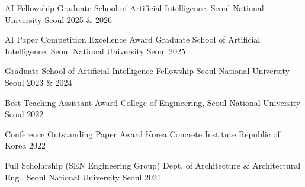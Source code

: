

\begin{cvhonors}

  \cvhonor
    {AI Fellowship} %
    {Graduate School of Artificial Intelligence, Seoul National University} %
    {Seoul} %
    {2025 \& 2026} %

  \cvhonor
    {AI Paper Competition Excellence Award} %
    {Graduate School of Artificial Intelligence, Seoul National University} %
    {Seoul} %
    {2025} %

  \cvhonor
    {Graduate School of Artificial Intelligence Fellowship} %
    {Seoul National University} %
    {Seoul} %
    {2023 \& 2024} %

  \cvhonor
    {Best Teaching Assistant Award} %
    {College of Engineering, Seoul National University} %
    {Seoul} %
    {2022} %

  \cvhonor
    {Conference Outstanding Paper Award} %
    {Korea Concrete Institute} %
    {Republic of Korea} %
    {2022} %

  \cvhonor
    {Full Scholarship (SEN Engineering Group)} %
    {Dept. of Architecture \& Architectural Eng., Seoul National University} %
    {Seoul} %
    {2021} %

\end{cvhonors}
